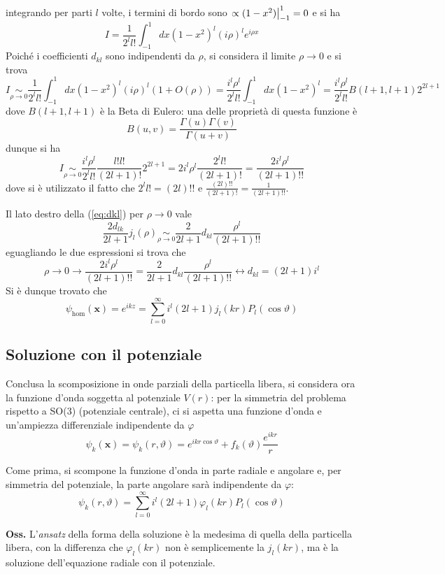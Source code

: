 integrando per parti $l$ volte, i termini di bordo sono $\eval{\propto(1-x^2)}_{-1}^1=0$ e
si ha
$$I = \frac{1}{2^ll!}\int_{-1}^{1}dx (1-x^2)^l(i\rho)^le^{i\rho x}$$
Poiché i coefficienti $d_{kl}$ sono indipendenti da $\rho$, si considera il limite
$\rho\to0$ e si trova
$$I\underset{\rho\to0}\sim\frac{1}{2^ll!}\int_{-1}^{1}dx (1-x^2)^l(i\rho)^l(1+O(\rho)) = 
\frac{i^l\rho^l}{2^ll!}\int_{-1}^{1}dx (1-x^2)^l = \frac{i^l\rho^l}{2^ll!}B(l+1,l+1)2^{2l+1}
$$
dove $B(l+1,l+1)$ è la Beta di Eulero: una delle proprietà di questa funzione è
$$B(u,v) = \frac{\Gamma(u)\Gamma(v)}{\Gamma(u+v)}$$
dunque si ha
$$I\underset{\rho\to0}\sim\frac{i^l\rho^l}{2^ll!}\frac{l!l!}{(2l+1)!}2^{2l+1} = 2i^l\rho^l
\frac{2^ll!}{(2l+1)!} = \frac{2i^l\rho^l}{(2l+1)!!}$$
dove si è utilizzato il fatto che $2^ll!=(2l)!!$ e $\frac{(2l)!!}{(2l+1)!} = \frac{1}{(2l+1)!!}$.

Il lato destro della (\ref{eq:dkl}) per $\rho\to0$ vale
$$\frac{2d_{lk}}{2l+1}j_l(\rho)\underset{\rho\to0}\sim\frac{2}{2l+1}d_{kl}\frac{\rho^l}{(2l+1)!!}$$
eguagliando le due espressioni si trova che
$$\rho\to0 \longrightarrow \frac{2i^l\rho^l}{(2l+1)!!} = \frac{2}{2l+1}d_{kl}\frac{\rho^l}{(2l+1)!!}
\leftrightarrow d_{kl} = (2l+1)i^l
$$
Si è dunque trovato che
$$\boxed{\psi_\text{hom}(\mathbf{x})=e^{ikz}=\sum_{l=0}^{\infty}i^l(2l+1)j_l(kr)P_l(\cos\vartheta)}$$
\subsection{Soluzione con il potenziale}
Conclusa la scomposizione in onde parziali della particella libera, si considera ora la funzione
d'onda soggetta al potenziale $V(r)$: per la simmetria del problema rispetto a SO(3) (potenziale
centrale), ci si aspetta una funzione d'onda e un'ampiezza differenziale indipendente da $\varphi$
\begin{equation}
\psi_k(\mathbf{x}) = \psi_k(r,\vartheta) = e^{ikr\cos\vartheta} + f_k(\vartheta)\frac{e^{ikr}}{r}
\label{eq:sol_pot}
\end{equation}

Come prima, si scompone la funzione d'onda in parte radiale e angolare e, per simmetria del
potenziale, la parte angolare sarà indipendente da $\varphi$:
\begin{equation*}
\psi_k(r,\vartheta) = \sum_{l=0}^{\infty}i^l(2l+1)\varphi_l(kr)P_l(\cos\vartheta)
\end{equation*}

\textbf{Oss.} L'\textit{ansatz} della forma della soluzione è la medesima di quella della particella
libera, con la differenza che $\varphi_l(kr)$ non è semplicemente la $j_l(kr)$, ma è la soluzione
dell'equazione radiale con il potenziale.

